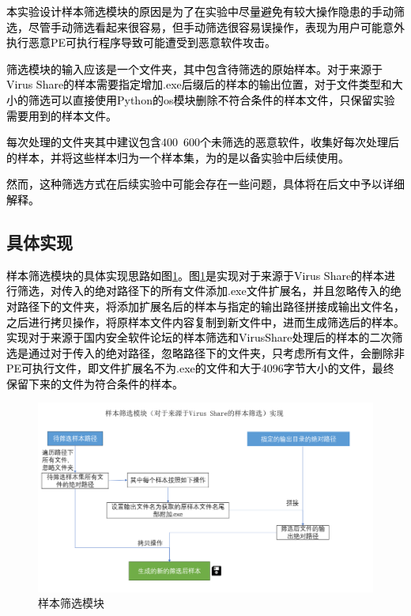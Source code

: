 \textcolor{black}{本实验设计样本筛选模块的原因是为了在实验中尽量避免有较大操作隐患的手动筛选，尽管手动筛选看起来很容易，但手动筛选很容易误操作，表现为用户可能意外执行恶意PE可执行程序导致可能遭受到恶意软件攻击。}

\textcolor{black}{筛选模块的输入应该是一个文件夹，其中包含待筛选的原始样本。对于来源于Virus Share的样本需要指定增加.exe后缀后的样本的输出位置，对于文件类型和大小的筛选可以直接使用Python的os模块删除不符合条件的样本文件，只保留实验需要用到的样本文件。 }

\textcolor{black}{每次处理的文件夹其中建议包含400~600个未筛选的恶意软件，收集好每次处理后的样本，并将这些样本归为一个样本集，为的是以备实验中后续使用。}

\textcolor{black}{然而，这种筛选方式在后续实验中可能会存在一些问题，具体将在后文中予以详细解释。}

\subsection{具体实现}

\textcolor{black}{样本筛选模块的具体实现思路如图\ref{fig:sample_swift_module}。图\ref{fig:sample_swift_module}是实现对于来源于Virus Share的样本进行筛选，对传入的绝对路径下的所有文件添加.exe文件扩展名，并且忽略传入的绝对路径下的文件夹，将添加扩展名后的样本与指定的输出路径拼接成输出文件名，之后进行拷贝操作，将原样本文件内容复制到新文件中，进而生成筛选后的样本。实现对于来源于国内安全软件论坛的样本筛选和VirusShare处理后的样本的二次筛选是通过对于传入的绝对路径，忽略路径下的文件夹，只考虑所有文件，会删除非PE可执行文件，即文件扩展名不为.exe的文件和大于4096字节大小的文件，最终保留下来的文件为符合条件的样本。}

\begin{figure}
  \centering
  \includegraphics[]{images/sample_swift_module.png}
  \caption{样本筛选模块}\label{fig:sample_swift_module}
\end{figure}

